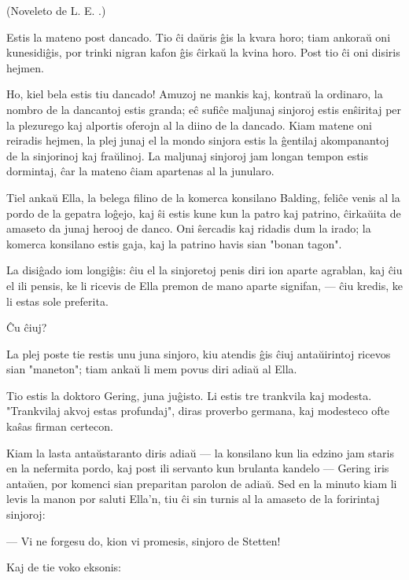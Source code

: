 \begin{center}
\footnotesize (Noveleto de L. E. .)
\end{center}

   Estis la mateno post dancado. Tio \^ci da\u uris \^gis la kvara horo;
tiam ankora\u u oni kunesidi\^gis, por trinki nigran kafon \^gis
\^cirka\u u la kvina horo. Post tio \^ci oni disiris hejmen.

   Ho, kiel bela estis tiu dancado! Amuzoj ne mankis kaj, kontra\u u la
ordinaro, la nombro de la dancantoj estis granda; e\^c sufi\^ce
maljunaj sinjoroj estis en\^siritaj per la plezurego kaj alportis
oferojn al la diino de la dancado. Kiam matene oni reiradis hejmen,
la plej junaj el la mondo sinjora estis la \^gentilaj akompanantoj
de la sinjorinoj kaj fra\u ulinoj. La maljunaj sinjoroj jam longan
tempon estis dormintaj, \^car la mateno \^ciam apartenas al la
junularo.

   Tiel anka\u u Ella, la belega filino de la komerca konsilano Balding,
feli\^ce venis al la pordo de la gepatra lo\^gejo, kaj \^si estis
kune kun la patro kaj patrino, \^cirka\u uita de amaseto da junaj
herooj de danco. Oni \^sercadis kaj ridadis dum la irado; la komerca
konsilano estis gaja, kaj la patrino havis sian "bonan tagon".

   La disi\^gado iom longi\^gis: \^ciu el la sinjoretoj penis diri ion
aparte agrablan, kaj \^ciu el ili pensis, ke li ricevis de Ella
premon de mano aparte signifan, --- \^ciu kredis, ke li estas sole
preferita.

   \^Cu \^ciuj?

   La plej poste tie restis unu juna sinjoro, kiu atendis \^gis \^ciuj
anta\u uirintoj ricevos sian "maneton"; tiam anka\u u li mem povus
diri adia\u u al Ella.

   Tio estis la doktoro Gering, juna ju\^gisto. Li estis tre trankvila
kaj modesta. "Trankvilaj akvoj estas profundaj", diras proverbo
germana, kaj modesteco ofte ka\^sas firman certecon.

   Kiam la lasta anta\u ustaranto diris adia\u u --- la konsilano kun lia
edzino jam staris en la nefermita pordo, kaj post ili servanto kun
brulanta kandelo --- Gering iris anta\u uen, por komenci sian
preparitan parolon de adia\u u. Sed en la minuto kiam li levis la
manon por saluti Ella'n, tiu \^ci sin turnis al la amaseto de la
foririntaj sinjoroj:

 --- Vi ne forgesu do, kion vi promesis, sinjoro de Stetten!

   Kaj de tie voko eksonis:

